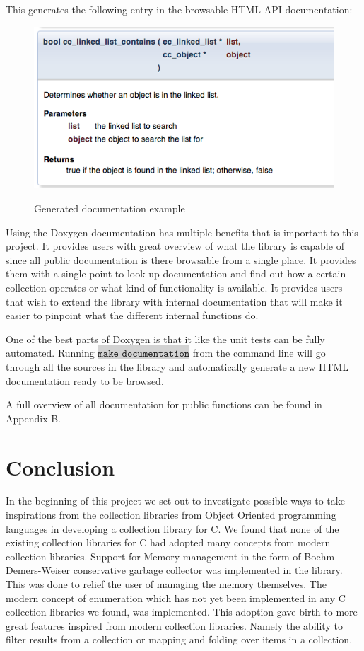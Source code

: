 \documentclass[table]{ituthesis}
\newcommand{\highlight}[1]{\colorbox{lightGray}{$\displaystyle \texttt{#1}$}}
\begin{document}
This generates the following entry in the browsable HTML API documentation:

	\begin{figure}[ht!]
		\begin{center}
			\includegraphics[scale=0.6]{images/doxygen_example.png}
			\label{fig:doxygen_example}
			\caption{Generated documentation example}
		\end{center}
	\end{figure}
	
	Using the Doxygen documentation has multiple benefits that is important to this project. It provides users with great overview of what the library is capable of since all public documentation is there browsable from a single place. It provides them with a single point to look up documentation and find out how a certain collection operates or what kind of functionality is available. It provides users that wish to extend the library with internal documentation that will make it easier to pinpoint what the different internal functions do.
	
	One of the best parts of Doxygen is that it like the unit tests can be fully automated. Running \highlight{make documentation} from the command line will go through all the sources in the library and automatically generate a new HTML documentation ready to be browsed.

	A full overview of all documentation for public functions can be found in Appendix B.

\chapter{Conclusion}
	
	In the beginning of this project we set out to investigate possible ways to take inspirations from the collection libraries from Object Oriented programming languages in developing a collection library for C. We found that none of the existing collection libraries for C had adopted many concepts from modern collection libraries. Support for Memory management in the form of Boehm-Demers-Weiser conservative garbage collector was implemented in the library. This was done to relief the user of managing the memory themselves. The modern concept of enumeration which has not yet been implemented in any C collection libraries we found, was implemented. This adoption gave birth to more great features inspired from modern collection libraries. Namely the ability to filter results from a collection or mapping and folding over items in a collection.
	
\end{document}
